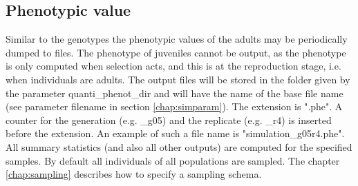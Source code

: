 \documentclass[letterpaper,12pt,oneside]{book}
\begin{document}
\subsection{Phenotypic value}\label{phenoQuanti}
Similar to the genotypes the phenotypic values of the adults may be periodically dumped to files. The phenotype of juveniles cannot be output, as the phenotype is only computed when selection acts, and this is at the reproduction stage, i.e. when individuals are adults. The output files will be stored in the folder given by the parameter \textsf{quanti\_phenot\_dir} and will have the name of the base file name (see parameter \textsf{filename} in section \ref{chap:simparam}). The extension is ".phe". A counter for the generation (e.g. \_g05) and the replicate (e.g. \_r4) is inserted before the extension. An example of such a file name is \textsf{"simulation\_g05r4.phe"}. All summary statistics (and also all other outputs) are computed for the specified samples. By default all individuals of all populations are sampled. The chapter \ref{chap:sampling} describes how to specify a sampling schema.
\end{document}
